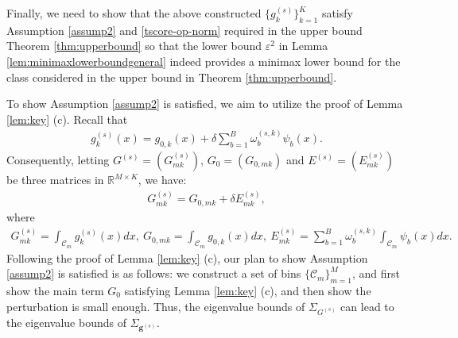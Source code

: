 \documentclass[preprint,11pt]{article}
\newcommand{\mbb}{\mathbb}
\newcommand{\mcal}{\mathcal}
\numberwithin{equation}{section}
\begin{document}
Finally, we need to show that the above constructed $\{g_k^{(s)}\}_{k=1}^K$ satisfy Assumption \ref{assump2} and \eqref{tscore-op-norm} required in the upper bound Theorem \ref{thm:upperbound}  so that the lower bound $\varepsilon^2$ in Lemma \ref{lem:minimaxlowerboundgeneral} indeed provides a minimax lower bound for the class considered in the upper bound in Theorem \ref{thm:upperbound}. 

To show Assumption \ref{assump2} is satisfied, we aim to utilize the proof of Lemma \ref{lem:key} (c). Recall that
\begin{align}\label{perturb}
    g_k^{(s)}(x)=g_{0,k}(x)+\delta\sum_{b=1}^B\omega_b^{(s,k)}\psi_b(x).
\end{align}
Consequently, letting $G^{(s)}=(G_{mk}^{(s)})$, $G_0=(G_{0,mk})$ and $E^{(s)}=(E_{mk}^{(s)})$ be three matrices in $\mbb{R}^{M\times K}$, we have:
\begin{align}\label{perturbationonG}
    G_{mk}^{(s)}=G_{0,mk}+\delta E_{mk}^{(s)},
\end{align}
where
\begin{align*}
    G_{mk}^{(s)} = \int_{\mcal{C}_m}g_k^{(s)}(x)dx,\ G_{0,mk} = \int_{\mcal{C}_m}g_{0,k}(x)dx,\ E_{mk}^{(s)}=\sum_{b=1}^B\omega_b^{(s,k)}\int_{\mcal{C}_m}\psi_b(x)dx.
\end{align*}
Following the proof of Lemma \ref{lem:key} (c), our plan to show Assumption \ref{assump2} is satisfied is as follows: we construct a set of bins $\{\mcal{C}_m\}_{m=1}^M$, and first show the main term $G_{0}$ satisfying Lemma \ref{lem:key} (c), and then show the perturbation is small enough. Thus, the eigenvalue bounds of $\Sigma_{G^{(s)}}$ can lead to the eigenvalue bounds of $\Sigma_{\bm{g}^{(s)}}$.
\end{document}
